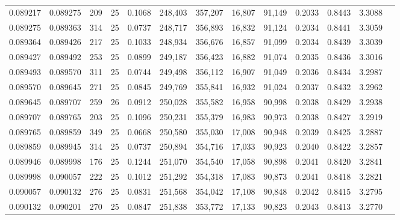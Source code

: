 \begin{tabular}{rrrrrrrrrrrrr}
0.089217 & 0.089275 &   209 &  25 &                                     0.1068 & 248,403 & 357,207 &  16,807 &  91,149 & 0.2033 & 0.8443 & 3.3088 \\
0.089275 & 0.089363 &   314 &  25 &                                     0.0737 & 248,717 & 356,893 &  16,832 &  91,124 & 0.2034 & 0.8441 & 3.3059 \\
0.089364 & 0.089426 &   217 &  25 &                                     0.1033 & 248,934 & 356,676 &  16,857 &  91,099 & 0.2034 & 0.8439 & 3.3039 \\
0.089427 & 0.089492 &   253 &  25 &                                     0.0899 & 249,187 & 356,423 &  16,882 &  91,074 & 0.2035 & 0.8436 & 3.3016 \\
0.089493 & 0.089570 &   311 &  25 &                                     0.0744 & 249,498 & 356,112 &  16,907 &  91,049 & 0.2036 & 0.8434 & 3.2987 \\
0.089570 & 0.089645 &   271 &  25 &                                     0.0845 & 249,769 & 355,841 &  16,932 &  91,024 & 0.2037 & 0.8432 & 3.2962 \\
0.089645 & 0.089707 &   259 &  26 &                                     0.0912 & 250,028 & 355,582 &  16,958 &  90,998 & 0.2038 & 0.8429 & 3.2938 \\
0.089707 & 0.089765 &   203 &  25 &                                     0.1096 & 250,231 & 355,379 &  16,983 &  90,973 & 0.2038 & 0.8427 & 3.2919 \\
0.089765 & 0.089859 &   349 &  25 &                                     0.0668 & 250,580 & 355,030 &  17,008 &  90,948 & 0.2039 & 0.8425 & 3.2887 \\
0.089859 & 0.089945 &   314 &  25 &                                     0.0737 & 250,894 & 354,716 &  17,033 &  90,923 & 0.2040 & 0.8422 & 3.2857 \\
0.089946 & 0.089998 &   176 &  25 &                                     0.1244 & 251,070 & 354,540 &  17,058 &  90,898 & 0.2041 & 0.8420 & 3.2841 \\
0.089998 & 0.090057 &   222 &  25 &                                     0.1012 & 251,292 & 354,318 &  17,083 &  90,873 & 0.2041 & 0.8418 & 3.2821 \\
0.090057 & 0.090132 &   276 &  25 &                                     0.0831 & 251,568 & 354,042 &  17,108 &  90,848 & 0.2042 & 0.8415 & 3.2795 \\
0.090132 & 0.090201 &   270 &  25 &                                     0.0847 & 251,838 & 353,772 &  17,133 &  90,823 & 0.2043 & 0.8413 & 3.2770 \\

\end{tabular}
